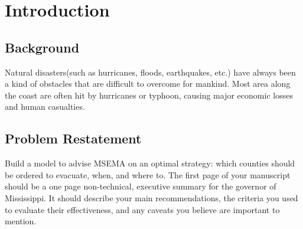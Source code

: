 \documentclass{mcmthesis}	%
\begin{document}
\newpage

\pagestyle{fancy}

\setcounter{page}{1}
\section{Introduction}%
\subsection{Background}%

Natural disasters(such as hurricanes, floods, earthquakes, etc.) have always been a kind of obstacles that are difficult to overcome for mankind. Most area along the coast are often hit by hurricanes or typhoon, causing major economic losses and human casualties.

%

\subsection{Problem Restatement}%

Build a model to advise MSEMA on an optimal strategy: which counties should be ordered to evacuate, when, and where to. The first page of your manuscript should be a one page non-technical, executive summary for the governor of Mississippi. It should describe your main recommendations, the criteria you used to evaluate their effectiveness, and any caveats you believe are important to mention.
\end{document}
